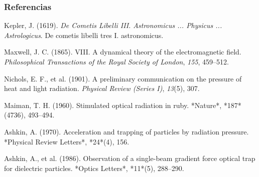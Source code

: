 \documentclass[10pt,aspectratio=1610,compress,dvipsnames]{beamer}
\begin{document}
\appendix
\setcounter{framenumber}{0}
\begin{frame}
\frametitle{Referencias} %

\small %

\setlength{\parskip}{6pt} %
\setlength{\itemsep}{6pt} %

\begin{flushleft}
Kepler, J. (1619). \textit{De Cometis Libelli III. Astronomicus ... Physicus ... Astrologicus}. De cometis libelli tres I. astronomicus.

Maxwell, J. C. (1865). VIII. A dynamical theory of the electromagnetic field. \textit{Philosophical Transactions of the Royal Society of London}, \textit{155}, 459–512.

Nichols, E. F., et al. (1901). A preliminary communication on the pressure of heat and light radiation. \textit{Physical Review (Series I)}, \textit{13}(5), 307.

Maiman, T. H. (1960). Stimulated optical radiation in ruby. *Nature*, *187*(4736), 493–494.


Ashkin, A. (1970). Acceleration and trapping of particles by radiation pressure. *Physical Review Letters*, *24*(4), 156.


Ashkin, A., et al. (1986). Observation of a single-beam gradient force optical trap for dielectric particles. *Optics Letters*, *11*(5), 288–290.





\end{flushleft}
\end{frame}
\end{document}
